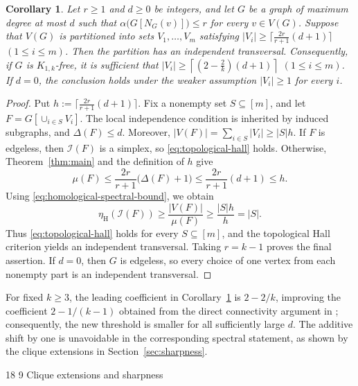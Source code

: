 \documentclass[11pt]{article}
\makeatletter
\renewcommand\section{\@startsection{section}{1}{\z@}%
{18\p@ \@plus 6\p@ \@minus 3\p@}%
{9\p@ \@plus 6\p@ \@minus 3\p@}%
{\large\bfseries\boldmath}}
\theoremstyle{plain}
\newtheorem{corollary}{Corollary}[section]
\theoremstyle{definition}
\numberwithin{equation}{section}
\makeatother
\begin{document}
\begin{corollary}\label{cor:independent-transversal}
Let $r\ge1$ and $d\ge0$ be integers, and let $G$ be a graph of maximum degree
at most $d$ such that $\alpha\big(G[N_G(v)]\big)\leq r$ for every $v\in V(G)$.
Suppose that $V(G)$ is partitioned into sets $V_1,\ldots,V_m$ satisfying 
$|V_i|\geq\big\lceil\frac{2r}{r+1}(d+1)\big\rceil$ $(1\leq i\leq m)$. 
Then the partition has an independent transversal.
Consequently, if $G$ is $K_{1,k}$-free, it is sufficient that
$|V_i|\geq\left\lceil\left(2-\frac{2}{k}\right)(d+1)\right\rceil$ $(1\leq i\leq m)$.
If $d=0$, the conclusion holds under the weaker assumption $|V_i|\ge1$ for
every $i$.
\end{corollary}

\begin{proof}
Put $h:= \big\lceil\frac{2r}{r+1}(d+1)\big\rceil$.
Fix a nonempty set $S\subseteq[m]$, and let
$F=G\left[\cup_{i\in S} V_i\right]$.
The local independence condition is inherited by induced subgraphs, and
$\Delta(F)\leq d$. Moreover,
$|V(F)| = \sum_{i\in S} |V_i|\geq |S|h$.
If $F$ is edgeless, then $\mathcal{I}(F)$ is a simplex, so
\eqref{eq:topological-hall} holds. Otherwise, Theorem~\ref{thm:main} and the
definition of $h$ give
\[
\mu(F)\leq \frac{2r}{r+1}\big(\Delta (F) + 1\big)
\leq \frac{2r}{r+1}(d+1) \leq h.
\]
Using \eqref{eq:homological-spectral-bound}, we obtain
\[
\eta_{\mathrm{H}}(\mathcal{I}(F))
\geq \frac{|V(F)|}{\mu(F)}\geq \frac{|S|h}{h} = |S|.
\]
Thus \eqref{eq:topological-hall} holds for every $S\subseteq[m]$, and the
topological Hall criterion yields an independent transversal.  Taking
$r=k-1$ proves the final assertion.
If $d=0$, then $G$ is edgeless, so every choice of one vertex from each
nonempty part is an independent transversal.
\end{proof}

For fixed $k\geq 3$, the leading coefficient in
Corollary~\ref{cor:independent-transversal} is $2-2/k$, improving the
coefficient $2-1/(k-1)$ obtained from the direct connectivity argument in
\cite{AharoniAlonBerger}; consequently, the new threshold is smaller for all
sufficiently large $d$. The additive shift by one is unavoidable in the
corresponding spectral statement, as shown by the clique extensions in
Section~\ref{sec:sharpness}.

\section{Clique extensions and sharpness}
\label{sec:sharpness}
\end{document}
